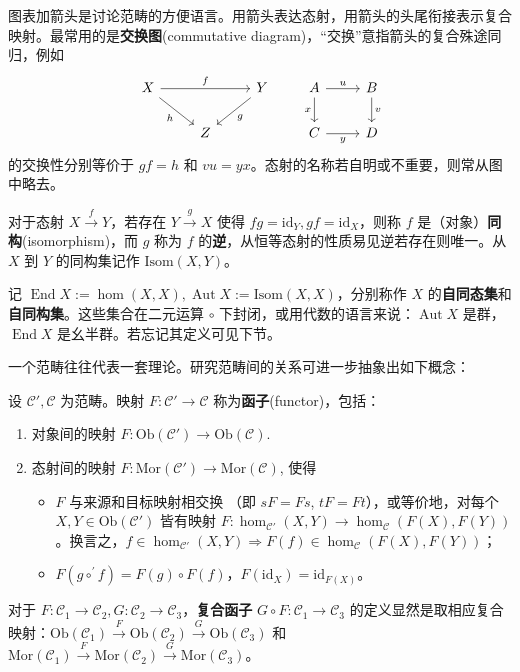 图表加箭头是讨论范畴的方便语言。用箭头表达态射，用箭头的头尾衔接表示复合映射。最常用的是\textbf{交换图}(commutative diagram)，“交换”意指箭头的复合殊途同归，例如
    \[ \begin{tikzcd}
        X \arrow[rr, "f"] \arrow[rd, "h"'] & & Y \arrow[ld, "g"] \\
        & Z &
    \end{tikzcd} \qquad \begin{tikzcd}
        A \arrow[r, "u"] \arrow[d, "x"'] & B \arrow[d, "v"] \\
        C \arrow[r, "y"'] & D
    \end{tikzcd} \]
的交换性分别等价于 $g f = h$ 和 $v u = y x$。态射的名称若自明或不重要，则常从图中略去。

\begin{definition}
    对于态射 $X \xrightarrow{f} Y$，若存在 $Y \xrightarrow{g} X$ 使得 $f g = \mathrm{id}_Y,g f = \mathrm{id}_X$，则称 $f$ 是（对象）\textbf{同构}(isomorphism)，而 $g$ 称为 $f$ 的\textbf{逆}，从恒等态射的性质易见逆若存在则唯一。从 $X$ 到 $Y$ 的同构集记作 $\mathrm{Isom}(X, Y)$。

    记 $\operatorname{End} X := \hom(X, X),\operatorname{Aut} X := \mathrm{Isom}(X, X)$，分别称作 $X$ 的\textbf{自同态集}和\textbf{自同构集}。这些集合在二元运算 $\circ$ 下封闭，或用代数的语言来说：$\operatorname{Aut} X$ 是群，
    $\operatorname{End} X$ 是幺半群。若忘记其定义可见下节。
\end{definition}

一个范畴往往代表一套理论。研究范畴间的关系可进一步抽象出如下概念：
\begin{definition}
    设 $\mathcal{C}', \mathcal{C}$ 为范畴。映射 $F: \mathcal{C}' \to \mathcal{C}$ 称为\textbf{函子}(functor)，包括：
    \begin{enumerate}
        \item 对象间的映射 $F: \mathrm{Ob}(\mathcal C')\to\mathrm{Ob}(\mathcal C)$.
        \item 态射间的映射 $F: \mathrm{Mor}(\mathcal C')\to \mathrm{Mor}(\mathcal C)$, 使得
            \begin{itemize}
                \item $F$ 与来源和目标映射相交换 （即 $sF=Fs$, $tF=Ft$），或等价地，对每个 $X, Y \in \mathrm{Ob}(\mathcal{C}')$ 皆有映射 $F: \hom_{\mathcal{C}'}(X, Y) \to \hom_{\mathcal{C}}(F(X), F(Y))$。换言之，$f\in \hom_{\mathcal{C}'}(X, Y)\Rightarrow F(f)\in \hom_{\mathcal{C}}(F(X), F(Y))$；
                \item $F(g\circ^{\prime} f) = F(g) \circ F(f)$，$F(\mathrm{id}_X) = \mathrm{id}_{F(X)}$。
            \end{itemize}
    \end{enumerate}
    对于 $F: \mathcal{C}_1 \to \mathcal{C}_2,G: \mathcal{C}_2 \to \mathcal{C}_3$，\textbf{复合函子} $G \circ F: \mathcal{C}_1 \to \mathcal{C}_3$ 的定义显然是取相应复合映射：$\mathrm{Ob}(\mathcal{C}_1) \xrightarrow{F} \mathrm{Ob}(\mathcal{C}_2) \xrightarrow{G} \mathrm{Ob}(\mathcal{C}_3)$ 和 $\mathrm{Mor}(\mathcal{C}_1) \xrightarrow{F} \mathrm{Mor}(\mathcal{C}_2) \xrightarrow{G} \mathrm{Mor}(\mathcal{C}_3)$。
\end{definition}

